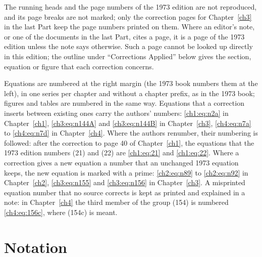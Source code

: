 The running heads and the page numbers of the 1973 edition are not reproduced, and its page breaks
are not marked; only the correction pages for Chapter~\ref{ch3} in the last Part keep the page
numbers printed on them. Where an editor's note, or one of the documents in the last Part, cites a
page, it is a page of the 1973 edition unless the note says otherwise. Such a page cannot be looked
up directly in this edition; the outline under ``Corrections Applied'' below gives the section,
equation or figure that each correction concerns.

Equations are numbered at the right margin (the 1973 book numbers them at the left), in one series
per chapter and without a chapter prefix, as in the 1973 book; figures and tables are numbered in
the same way. Equations that a correction inserts between existing ones carry the authors' numbers:
\eqref{ch1:eq:n2a} in Chapter~\ref{ch1}, \eqref{ch3:eq:n144A} and \eqref{ch3:eq:n144B} in
Chapter~\ref{ch3}, \eqref{ch4:eq:n7a} to \eqref{ch4:eq:n7d} in Chapter~\ref{ch4}. Where the authors
renumber, their numbering is followed: after the correction to page 40 of Chapter~\ref{ch1}, the
equations that the 1973 edition numbers (21) and (22) are \eqref{ch1:eq:21} and \eqref{ch1:eq:22}.
Where a correction gives a new equation a number that an unchanged 1973 equation keeps, the new
equation is marked with a prime: \eqref{ch2:eq:n89} to \eqref{ch2:eq:n92} in Chapter~\ref{ch2},
\eqref{ch3:eq:n155} and \eqref{ch3:eq:n156} in Chapter~\ref{ch3}. A misprinted equation number that
no source corrects is kept as printed and explained in a note: in Chapter~\ref{ch4} the third member
of the group (154) is numbered \eqref{ch4:eq:156c}, where (154c) is meant.

\section*{Notation}

